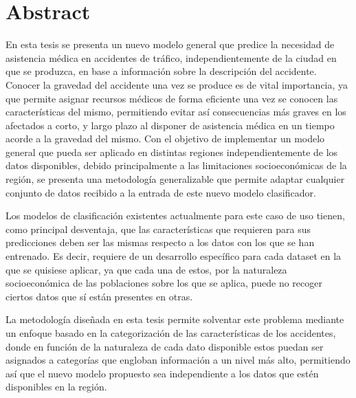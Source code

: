 \chapter*{Abstract}






En esta tesis se presenta un nuevo modelo general que predice la necesidad de asistencia médica en accidentes de tráfico, independientemente de la ciudad en que se produzca, en base a información sobre la descripción del accidente. Conocer la gravedad del accidente una vez se produce es de vital importancia, ya que permite asignar recursos médicos de forma eficiente una vez se conocen las características del mismo, permitiendo evitar así consecuencias más graves en los afectados a corto, y largo plazo al disponer de asistencia médica en un tiempo acorde a la gravedad del mismo. Con el objetivo de implementar un modelo general que pueda ser aplicado en distintas regiones independientemente de los datos disponibles, debido principalmente a las limitaciones socioeconómicas de la región, se presenta una metodología generalizable que permite adaptar cualquier conjunto de datos recibido a la entrada de este nuevo modelo clasificador.

Los modelos de clasificación existentes actualmente para este caso de uso tienen, como principal desventaja, que las características que requieren para sus predicciones deben ser las mismas respecto a los datos con los que se han entrenado. 
Es decir, requiere de un desarrollo específico para cada dataset en la que se quisiese aplicar, ya que cada una de estos, por la naturaleza socioeconómica de las poblaciones sobre los que se aplica, puede no recoger ciertos datos que sí están presentes en otras. 

La metodología diseñada en esta tesis permite solventar este problema mediante un enfoque basado en la categorización de las características de los accidentes, donde en función de la naturaleza de cada dato disponible estos puedan ser asignados a categorías que engloban información a un nivel más alto, permitiendo así que el nuevo modelo propuesto sea independiente a los datos que estén disponibles en la región.

